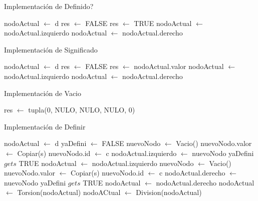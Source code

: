 \newpage

\begin{Algoritmos}

\begin{algorithm}
\caption{Implementaci\'on de Definido?}
\begin{algorithmic}[0]
	\State nodoActual $\gets$ d
	\State res $\gets$ FALSE
			res $\gets$ TRUE
		\Else
				nodoActual $\gets$ nodoActual.izquierdo
			\Else
				nodoActual $\gets$ nodoActual.derecho
			\EndIf
		\EndIf
	\EndWhile
\EndFunction
\end{algorithmic}
\end{algorithm}

\begin{algorithm}
\caption{Implementaci\'on de Significado}
\begin{algorithmic}[0]
	\State nodoActual $\gets$ d
	\State res $\gets$ FALSE
			res $\gets$ nodoActual.valor
		\Else
				nodoActual $\gets$ nodoActual.izquierdo
			\Else
				nodoActual $\gets$ nodoActual.derecho
			\EndIf
		\EndIf
	\EndWhile
\EndFunction
\end{algorithmic}
\end{algorithm}

\begin{algorithm}
\caption{Implementaci\'on de Vacio}
\begin{algorithmic}[0]
	\State res $\gets$ tupla(0, NULO, NULO, NULO, 0)
\EndFunction
\end{algorithmic}
\end{algorithm}

\begin{algorithm}
\caption{Implementaci\'on de Definir}
\begin{algorithmic}[0]
	\State nodoActual $\gets$ d
	\State yaDefini $\gets$ FALSE
				\State nuevoNodo $\gets$ Vacio() 
				\State nuevoNodo.valor $\gets$ Copiar(s)
				\State nuevoNodo.id $\gets$ c
				\State nodoActual.izquierdo $\gets$ nuevoNodo
				\State yaDefini $gets$ TRUE
			\Else
				\State nodoActual $\gets$ nodoActual.izquierdo
			\EndIf
		\Else
				\State nuevoNodo $\gets$ Vacio() 
				\State nuevoNodo.valor $\gets$ Copiar(s)
				\State nuevoNodo.id $\gets$ c
				\State nodoActual.derecho $\gets$ nuevoNodo
				\State yaDefini $gets$ TRUE
			\Else
				\State nodoActual $\gets$ nodoActual.derecho
			\EndIf
		\EndIf
	\EndWhile
	\State nodoActual $\gets$ Torsion(nodoActual)
	\State nodoACtual $\gets$ Division(nodoActual)
\EndFunction
\end{algorithmic}
\end{algorithm}


\FloatBarrier
\end{Algoritmos}